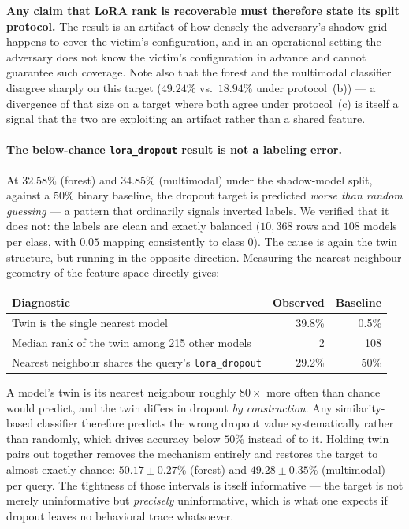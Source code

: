 \documentclass[11pt]{article}
\newcommand{\hd}[1]{\texttt{#1}}
\begin{document}
\textbf{Any claim that LoRA rank is recoverable must therefore state its split protocol.}
The result is an artifact of how densely the adversary's shadow grid happens to cover the
victim's configuration, and in an operational setting the adversary does not know the
victim's configuration in advance and cannot guarantee such coverage. Note also that the
forest and the multimodal classifier disagree sharply on this target ($49.24\%$ vs.\
$18.94\%$ under protocol~(b)) --- a divergence of that size on a target where both agree
under protocol~(c) is itself a signal that the two are exploiting an artifact rather than
a shared feature.

\paragraph{The below-chance \hd{lora\_dropout} result is not a labeling error.} At
$32.58\%$ (forest) and $34.85\%$ (multimodal) under the shadow-model split, against a
$50\%$ binary baseline, the dropout target is predicted \emph{worse than random guessing}
--- a pattern that ordinarily signals inverted labels. We verified that it does not: the
labels are clean and exactly balanced ($10{,}368$ rows and $108$ models per class, with
$0.05$ mapping consistently to class $0$). The cause is again the twin structure, but
running in the opposite direction. Measuring the nearest-neighbour geometry of the feature
space directly gives:

\begin{center}
\begin{tabular}{lrr}
\toprule
Diagnostic & Observed & Baseline \\
\midrule
Twin is the single nearest model & 39.8\% & 0.5\% \\
Median rank of the twin among 215 other models & 2 & 108 \\
Nearest neighbour shares the query's \hd{lora\_dropout} & 29.2\% & 50\% \\
\bottomrule
\end{tabular}
\end{center}

A model's twin is its nearest neighbour roughly $80\times$ more often than chance would
predict, and the twin differs in dropout \emph{by construction}. Any similarity-based
classifier therefore predicts the wrong dropout value systematically rather than randomly,
which drives accuracy below $50\%$ instead of to it. Holding twin pairs out together
removes the mechanism entirely and restores the target to almost exactly chance:
$50.17 \pm 0.27\%$ (forest) and $49.28 \pm 0.35\%$ (multimodal) per query. The tightness
of those intervals is itself informative --- the target is not merely uninformative but
\emph{precisely} uninformative, which is what one expects if dropout leaves no behavioral
trace whatsoever.
\end{document}
